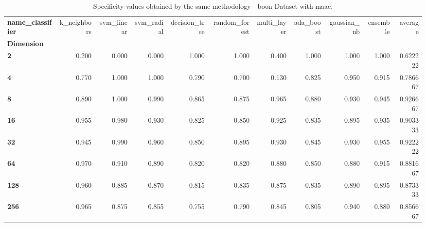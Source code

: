 \begin{table}
\centering
\caption{Specificity values obtained by the same methodology - boon Dataset with maae.}
\label{specificity_boon_maae-reproduction}
\begin{tabular}{lrrrrrrrrrr}
\toprule
\textbf{name\_classifier} &  k\_neighbors &  svm\_linear &  svm\_radial &  decision\_tree &  random\_forest &  multi\_layer &  ada\_boost &  gaussian\_nb &  ensemble &   average \\
\textbf{Dimension} &              &             &             &                &                &              &            &              &           &           \\
\midrule
\textbf{2        } &        0.200 &       0.000 &       0.000 &          1.000 &          1.000 &        0.400 &      1.000 &        1.000 &     1.000 &  0.622222 \\
\textbf{4        } &        0.770 &       1.000 &       1.000 &          0.790 &          0.700 &        0.130 &      0.825 &        0.950 &     0.915 &  0.786667 \\
\textbf{8        } &        0.890 &       1.000 &       0.990 &          0.865 &          0.875 &        0.965 &      0.880 &        0.930 &     0.945 &  0.926667 \\
\textbf{16       } &        0.955 &       0.980 &       0.930 &          0.825 &          0.850 &        0.925 &      0.835 &        0.895 &     0.935 &  0.903333 \\
\textbf{32       } &        0.945 &       0.990 &       0.960 &          0.850 &          0.895 &        0.930 &      0.845 &        0.930 &     0.955 &  0.922222 \\
\textbf{64       } &        0.970 &       0.910 &       0.890 &          0.820 &          0.820 &        0.880 &      0.850 &        0.880 &     0.915 &  0.881667 \\
\textbf{128      } &        0.960 &       0.885 &       0.870 &          0.815 &          0.835 &        0.875 &      0.835 &        0.890 &     0.895 &  0.873333 \\
\textbf{256      } &        0.965 &       0.875 &       0.855 &          0.755 &          0.790 &        0.845 &      0.805 &        0.940 &     0.880 &  0.856667 \\
\bottomrule
\end{tabular}
\end{table}

